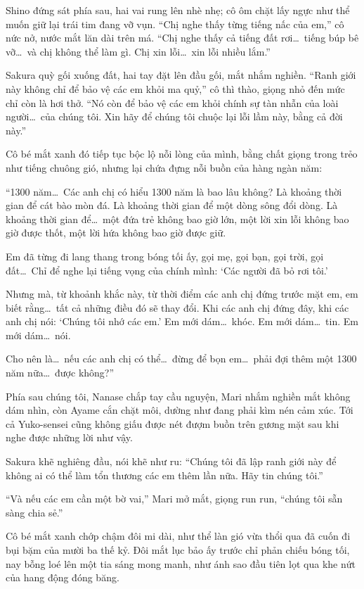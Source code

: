 \documentclass[../main.tex]{subfiles}
\begin{document}
Shino đứng sát phía sau, hai vai rung lên nhè nhẹ; cô ôm chặt lấy ngực như thể muốn giữ lại trái tim đang vỡ vụn. ``Chị nghe thấy từng tiếng nấc của em,'' cô nức nở, nước mắt lăn dài trên má. ``Chị nghe thấy cả tiếng đất rơi\dots\ tiếng búp bê vỡ\dots\ và chị không thể làm gì. Chị xin lỗi\dots\ xin lỗi nhiều lắm.''

Sakura quỳ gối xuống đất, hai tay đặt lên đầu gối, mắt nhắm nghiền. ``Ranh giới này không chỉ để bảo vệ các em khỏi ma quỷ,'' cô thì thào, giọng nhỏ đến mức chỉ còn là hơi thở. ``Nó còn để bảo vệ các em khỏi chính sự tàn nhẫn của loài người\dots\ của chúng tôi. Xin hãy để chúng tôi chuộc lại lỗi lầm này, bằng cả đời này.''

Cô bé mắt xanh đó tiếp tục bộc lộ nỗi lòng của mình, bằng chất giọng trong trẻo như tiếng chuông gió, nhưng lại chứa đựng nỗi buồn của hàng ngàn năm:

``1300 năm\dots\
Các anh chị có hiểu 1300 năm là bao lâu không?
Là khoảng thời gian để cát bào mòn đá.
Là khoảng thời gian để một dòng sông đổi dòng.
Là khoảng thời gian để\dots\ một đứa trẻ không bao giờ lớn,
một lời xin lỗi không bao giờ được thốt,
một lời hứa không bao giờ được giữ.

Em đã từng đi lang thang trong bóng tối ấy,
gọi mẹ, gọi bạn, gọi trời, gọi đất\dots\
Chỉ để nghe lại tiếng vọng của chính mình:
`Các người đã bỏ rơi tôi.'

Nhưng mà, từ khoảnh khắc này, từ thời điểm các anh chị đứng trước mặt em,
em biết rằng\dots\ tất cả những điều đó sẽ thay đổi.
Khi các anh chị đứng đây,
khi các anh chị nói: `Chúng tôi nhớ các em.'
Em mới dám\dots\ khóc.
Em mới dám\dots\ tin.
Em mới dám\dots\ nói.

Cho nên là\dots\
nếu các anh chị có thể\dots\
đừng để bọn em\dots\
phải đợi thêm một 1300 năm nữa\dots\
được không?''

Phía sau chúng tôi, Nanase chắp tay cầu nguyện, Mari nhắm nghiền mắt không dám nhìn, còn Ayame cắn chặt môi, dường như đang phải kìm nén cảm xúc. Tới cả Yuko-sensei cũng không giấu được nét đượm buồn trên gương mặt sau khi nghe được những lời như vậy.

Sakura khẽ nghiêng đầu, nói khẽ như ru: ``Chúng tôi đã lập ranh giới này để không ai có thể làm tổn thương các em thêm lần nữa. Hãy tin chúng tôi.''

``Và nếu các em cần một bờ vai,'' Mari mở mắt, giọng run run, ``chúng tôi sẵn sàng chia sẻ.''

Cô bé mắt xanh chớp chậm đôi mi dài, như thể làn gió vừa thổi qua đã cuốn đi bụi bặm của mười ba thế kỷ. Đôi mắt lục bảo ấy trước chỉ phản chiếu bóng tối, nay bỗng loé lên một tia sáng mong manh, như ánh sao đầu tiên lọt qua khe nứt của hang động đóng băng.
\end{document}
